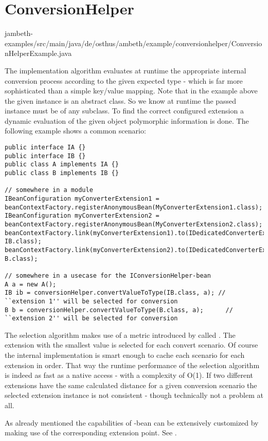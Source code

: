 \goodbreak
\section{ConversionHelper}
\label{feature:ConversionHelper}

{jambeth-examples/src/main/java/de/osthus/ambeth/example/conversionhelper/ConversionHelperExample.java}

The implementation algorithm evaluates at runtime the appropriate internal conversion process according to the given expected type - which is far more sophisticated than a simple key/value mapping. Note that in the example above the given  instance is an abstract class. So we know at runtime the passed instance must be of any subclass. To find the correct configured extension a dynamic evaluation of the given object polymorphic information is done. The following example shows a common scenario:

\begin{lstlisting}[style=Java]
public interface IA {}
public interface IB {}
public class A implements IA {}
public class B implements IB {}

// somewhere in a module
IBeanConfiguration myConverterExtension1 = beanContextFactory.registerAnonymousBean(MyConverterExtension1.class);
IBeanConfiguration myConverterExtension2 = beanContextFactory.registerAnonymousBean(MyConverterExtension2.class);
beanContextFactory.link(myConverterExtension1).to(IDedicatedConverterExtendable.class).with(IA.class, IB.class);
beanContextFactory.link(myConverterExtension2).to(IDedicatedConverterExtendable.class).with(IA.class, B.class);

// somewhere in a usecase for the IConversionHelper-bean
A a = new A();
IB ib = conversionHelper.convertValueToType(IB.class, a); // ``extension 1'' will be selected for conversion
B b = conversionHelper.convertValueToType(B.class, a);		// ``extension 2'' will be selected for conversion
\end{lstlisting}

The selection algorithm makes use of a metric introduced by \AMBETH{} called . The extension with the smallest value is selected for each convert scenario. Of course the internal implementation is smart enough to cache each scenario for each extension in order. That way the runtime performance of the selection algorithm is indeed as fast as a native  access - with a complexity of O(1). If two different extensions have the same calculated distance for a given conversion scenario the selected extension instance is not consistent - though technically not a problem at all.

As already mentioned the capabilities of -bean can be extensively customized by making use of the corresponding extension point. See .